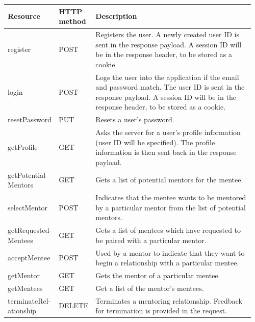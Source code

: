 \documentclass[10pt]{article}
\begin{document}
\begin{longtable}{|p{0.128\linewidth}|p{0.08\linewidth}|p{0.75\linewidth}|}
    \hline \textbf{Resource} & \textbf{HTTP method} & \textbf{Description} \\ \hline\hline
    register
    &
    POST
    &
    Registers the user. A newly created user ID is sent in the response payload. A session ID will be in the response header, to be stored as a cookie.
    \\ \hline

    login
    &
    POST
    &
    Logs the user into the application if the email and password match. The user ID is sent in the response payload. A session ID will be in the response header, to be stored as a cookie.
    \\ \hline

    resetPassword
    &
    PUT
    &
    Resets a user's password.
    \\ \hline

    getProfile
    &
    GET
    &
    Asks the server for a user's profile information (user ID will be specified). The profile information is then sent back in the response payload.
    \\ \hline

    getPotential- Mentors
    &
    GET
    &
    Gets a list of potential mentors for the mentee.
    \\ \hline

    selectMentor
    &
    POST
    &
    Indicates that the mentee wants to be mentored by a particular mentor from the list of potential mentors.
    \\ \hline

    getRequested- Mentees
    &
    GET
    &
    Gets a list of mentees which have requested to be paired with a particular mentor.
    \\ \hline

    acceptMentee
    &
    POST
    &
    Used by a mentor to indicate that they want to begin a relationship with a particular mentee.
    \\ \hline

    getMentor
    &
    GET
    &
    Gets the mentor of a particular mentee.
    \\ \hline

    getMentees
    &
    GET
    &
    Get a list of the mentor's mentees.
    \\ \hline

    terminateRel- ationship
    &
    DELETE
    &
    Terminates a mentoring relationship. Feedback for termination is provided in the request.
    \\ \hline


\end{longtable}
\end{document}

